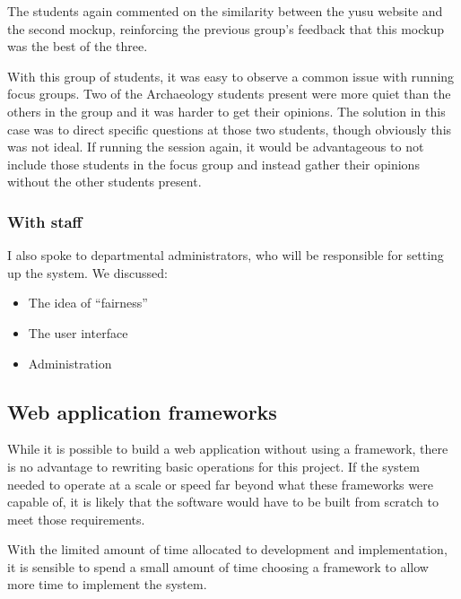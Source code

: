 \documentclass[draft]{scrartcl}
\begin{document}
The students again commented on the similarity between the \gls{yusu} website
and the second mockup, reinforcing the previous group's feedback that this
mockup was the best of the three.

With this group of students, it was easy to observe a common issue with
running focus groups. Two of the Archaeology students present were more
quiet than the others in the group and it was harder to get their opinions.
The solution in this case was to direct specific questions at those two
students, though obviously this was not ideal. If running the session again,
it would be advantageous to not include those students in the focus group
and instead gather their opinions without the other students present.

\subsubsection{With staff}

I also spoke to departmental administrators, who will be responsible for setting up
the system. We discussed:

\begin{itemize}
  \item The idea of ``fairness''
  \item The user interface
  \item Administration
\end{itemize}


\subsection{Web application frameworks}
\label{sec:webframeworks}


While it is possible to build a web application without using a framework,
there is no advantage to rewriting basic operations for this project. If the
system needed to operate at a scale or speed far beyond what these frameworks
were capable of, it is likely that the software would have to be built from
scratch to meet those requirements.

With the limited amount of time allocated to development and implementation,
it is sensible to spend a small amount of time choosing a framework to allow
more time to implement the system.

\end{document}
